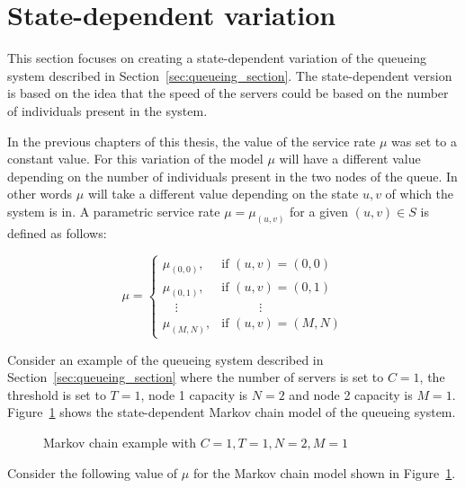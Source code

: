 \section{State-dependent variation}\label{sec:state_dependent}

This section focuses on creating a state-dependent variation of the queueing
system described in Section~\ref{sec:queueing_section}.
The state-dependent version is based on the idea that the speed of the servers
could be based on the number of individuals present in the system.

In the previous chapters of this thesis, the value of the service rate \(\mu\)
was set to a constant value.
For this variation of the model \(\mu\) will have a different value depending
on the number of individuals present in the two nodes of the queue.
In other words \(\mu\) will take a different value depending on the state
\(u, v\) of which the system is in.
A parametric service rate \(\mu = \mu_{(u,v)}\) for a given \((u, v) \in S\) is
defined as follows:

\begin{equation}\label{eq:state_dependent_service_rate}
    \mu =
    \begin{cases}
        \mu_{(0,0)}, & \text{if } (u, v) = (0, 0) \\
        \mu_{(0,1)}, & \text{if } (u, v) = (0, 1) \\
        \quad \vdots & \qquad \quad \vdots \\
        \mu_{(M,N)}, & \text{if } (u, v) = (M, N)
    \end{cases}
\end{equation}

Consider an example of the queueing system described in
Section~\ref{sec:queueing_section} where the number of servers is set to
\(C = 1\), the threshold is set to \(T = 1\), node 1 capacity is \(N = 2\) and
node 2 capacity is \(M = 1\).
Figure~\ref{fig:state_dependent_markov_example} shows the state-dependent
Markov chain model of the queueing system.

\begin{figure}[H]
    \centering
    
    \caption{Markov chain example with \(C=1, T=1, N=2, M=1\)}
    \label{fig:state_dependent_markov_example}
\end{figure}

Consider the following value of \(\mu\) for the Markov chain model shown in
Figure~\ref{fig:state_dependent_markov_example}.

